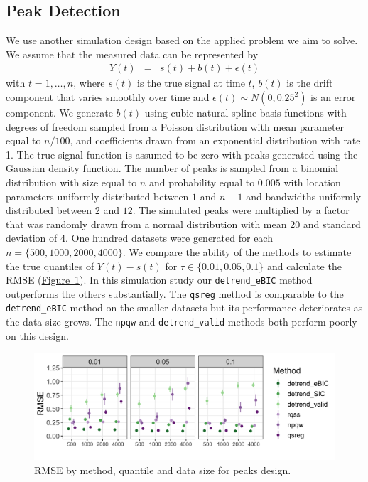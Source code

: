 \documentclass[12pt]{article}
\newcommand{\Fig}[1]{\hyperref[fig:#1]{Figure~\ref*{fig:#1}}} %
\newcommand{\Fig}[1]{{Figure~\ref{fig:#1}}} %
\begin{document}
	\subsection{Peak Detection}
	We use another simulation design based on the applied problem we aim to solve. We assume that the measured data can be represented by 
	\begin{eqnarray*}
	Y(t) & = & s(t) + b(t) + \epsilon(t)
	\end{eqnarray*} 
	with $t = 1, \ldots, n$, where $s(t)$ is the true signal at time $t$, $b(t)$ is the drift component that varies smoothly over time and $\epsilon(t) \sim N(0, 0.25^2)$ is an error component. We generate $b(t)$ using cubic natural spline basis functions with degrees of freedom sampled from a Poisson distribution with mean parameter equal to $n/100$,  and coefficients drawn from an exponential distribution with rate 1. The true signal function is assumed to be zero with peaks generated using the Gaussian density function. The number of peaks is sampled from a binomial distribution with size equal to $n$ and probability equal to $0.005$ with location parameters uniformly distributed between $1$ and $n-1$ and bandwidths uniformly distributed between $2$ and $12$. The simulated peaks were multiplied by a factor that was randomly drawn from a normal distribution with mean 20 and standard deviation of 4. One hundred datasets were generated for each $n=\{500, 1000, 2000, 4000\}$. We compare the ability of the methods to estimate the true quantiles of $Y(t)-s(t)$  for $\tau \in \{0.01, 0.05, 0.1\}$ and calculate the RMSE (\Fig{peaks_rmse}). In this simulation study our \texttt{detrend\_eBIC} method outperforms the others substantially. The \texttt{qsreg} method is comparable to the \texttt{detrend\_eBIC} method on the smaller datasets but its performance deteriorates as the data size grows. The \texttt{npqw} and \texttt{detrend\_valid} methods both perform poorly on this design. 
	
	\begin{figure}
		\includegraphics[width = \linewidth]{Figures/peaks_mse.png}
		\caption{RMSE by method, quantile and data size for peaks design.}			
		\label{fig:peaks_rmse}
	\end{figure}
	
\end{document}
